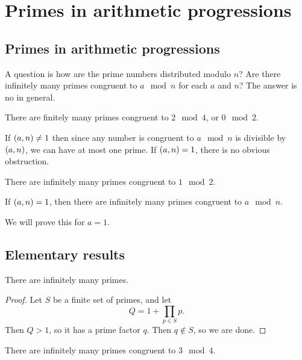 \pagebreak

\section{Primes in arithmetic progressions}

\subsection{Primes in arithmetic progressions}

A question is how are the prime numbers distributed modulo $ n $? Are there infinitely many primes congruent to $ a \mod n $ for each $ a $ and $ n $? The answer is no in general.

\begin{example*}
There are finitely many primes congruent to $ 2 \mod 4 $, or $ 0 \mod 2 $.
\end{example*}

If $ \br{a, n} \ne 1 $ then since any number is congruent to $ a \mod n $ is divisible by $ \br{a, n} $, we can have at most one prime. If $ \br{a, n} = 1 $, there is no obvious obstruction.

\begin{example*}
There are infinitely many primes congruent to $ 1 \mod 2 $.
\end{example*}

\begin{theorem}
If $ \br{a, n} = 1 $, then there are infinitely many primes congruent to $ a \mod n $.
\end{theorem}

We will prove this for $ a = 1 $.

\subsection{Elementary results}

\begin{theorem}
There are infinitely many primes.
\end{theorem}

\begin{proof}
Let $ S $ be a finite set of primes, and let
$$ Q = 1 + \prod_{p \in S} p. $$
Then $ Q > 1 $, so it has a prime factor $ q $. Then $ q \notin S $, so we are done.
\end{proof}

\begin{theorem}
There are infinitely many primes congruent to $ 3 \mod 4 $.
\end{theorem}

